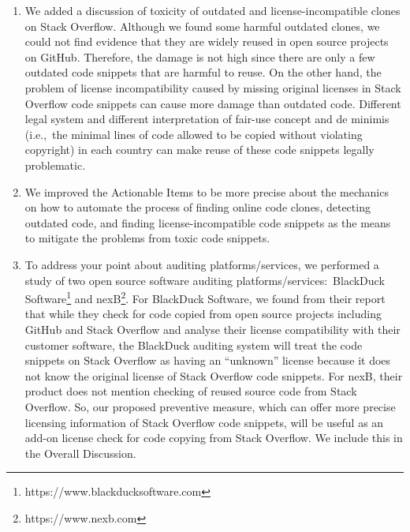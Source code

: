 \documentclass[a4paper,twoside,10pt]{reviewresponse}
\begin{document}
\begin{enumerate} \item We added a discussion of toxicity of outdated and
	license-incompatible clones on Stack Overflow. Although we found some harmful
	outdated clones, we could not find evidence that they are widely reused in open
	source projects on GitHub. Therefore, the damage is not high since there are only
	a few outdated code snippets that are harmful to reuse. On the other hand, the
	problem of license incompatibility caused by missing original licenses in Stack
	Overflow code snippets can cause more damage than outdated code. Different legal
	system and different interpretation of fair-use concept and de minimis (i.e.,~the
	minimal lines of code allowed to be copied without violating copyright) in each
	country can make reuse of these code snippets legally problematic.
	
	\item We improved the Actionable Items to be more precise about the mechanics
	on how to automate the process of finding online code clones, detecting
	outdated code, and finding license-incompatible code snippets as the means
	to mitigate the problems from toxic code snippets.
	
	\item To address your point about auditing platforms/services, we performed a
	study of two open source software auditing platforms/services:~BlackDuck
	Software\footnote{https://www.blackducksoftware.com} and
	nexB\footnote{https://www.nexb.com}. For BlackDuck Software, we found from
	their report~\citep{CORSI2017} that while they check for code copied from open
	source projects including GitHub and Stack Overflow and analyse their license
	compatibility with their customer software, the BlackDuck auditing system will
	treat the code snippets on Stack Overflow as having an ``unknown'' license because
	it does not know the original license of Stack Overflow code snippets. For
	nexB, their product does not mention checking of reused source code from Stack
	Overflow. So, our proposed preventive measure, which can offer more precise
	licensing information of Stack Overflow code snippets, will be useful as an
	add-on license check for code copying from Stack Overflow. We include this in
	the Overall Discussion. \end{enumerate}

\end{document}
